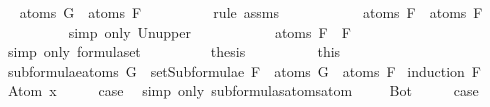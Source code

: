 \begin{isabellebody}
\ \isamarkupfalse%
\ {\isachardoublequoteopen}atoms\ G\ {\isasymsubseteq}\ atoms\ F{}{\isachardoublequoteclose}\isanewline
\ \ \ \ \ \ \ \ \isamarkupfalse%
\ {\isacharparenleft}rule\ assms{\isacharparenleft}{}{\isacharparenright}{\isacharparenright}\isanewline
\ \ \ \ \ \ \isamarkupfalse%
\ \isamarkupfalse%
\ {\isachardoublequoteopen}{\isasymdots}\ {\isasymsubseteq}\ atoms\ F{}\ {\isasymunion}\ atoms\ F{}{\isachardoublequoteclose}\isanewline
\ \ \ \ \ \ \ \ \isamarkupfalse%
\ {\isacharparenleft}simp\ only{\isacharcolon}\ Un{\isacharunderscore}upper{}{\isacharparenright}\isanewline
\ \ \ \ \ \ \isamarkupfalse%
\ \isamarkupfalse%
\ {\isachardoublequoteopen}{\isasymdots}\ {\isacharequal}\ atoms\ {\isacharparenleft}F{}\ \isactrlbold {\isasymrightarrow}\ F{}{\isacharparenright}{\isachardoublequoteclose}\isanewline
\ \ \ \ \ \ \ \ \isamarkupfalse%
\ {\isacharparenleft}simp\ only{\isacharcolon}\ formula{\isachardot}set{\isacharparenleft}{}{\isacharparenright}{\isacharparenright}\isanewline
\ \ \ \ \ \ \isamarkupfalse%
\ \isamarkupfalse%
\ {\isacharquery}thesis\isanewline
\ \ \ \ \ \ \ \ \isamarkupfalse%
\ this\isanewline
\ \ \ \ \isamarkupfalse%
\isanewline
\ \ \isamarkupfalse%
\isanewline
{}\isamarkupfalse%
%
\endisatagproof
{\isafoldproof}%
%
\isadelimproof
\isanewline
%
\endisadelimproof
\isanewline
{}\isamarkupfalse%
\ subformulae{\isacharunderscore}atoms{\isacharcolon}\ {\isachardoublequoteopen}G\ {\isasymin}\ setSubformulae\ F\ {\isasymLongrightarrow}\ atoms\ G\ {\isasymsubseteq}\ atoms\ F{\isachardoublequoteclose}\isanewline
%
\isadelimproof
%
\endisadelimproof
%
\isatagproof
{}\isamarkupfalse%
\ {\isacharparenleft}induction\ F{\isacharparenright}\isanewline
\ \ \isamarkupfalse%
\ {\isacharparenleft}Atom\ x{\isacharparenright}\isanewline
\ \ \isamarkupfalse%
\ \isamarkupfalse%
\ {\isacharquery}case\ \isamarkupfalse%
\ {\isacharparenleft}simp\ only{\isacharcolon}\ subformulas{\isacharunderscore}atoms{\isacharunderscore}atom{\isacharparenright}\ \isanewline
{}\isamarkupfalse%
\isanewline
\ \ \isamarkupfalse%
\ Bot\isanewline
\ \ \isamarkupfalse%
\ \isamarkupfalse%
\ {\isacharquery}case\ \isamarkupfalse%

\end{isabellebody}
